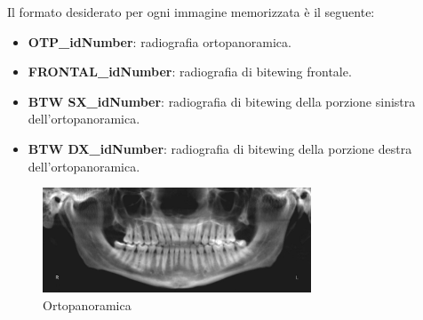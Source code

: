 \documentclass[12pt,a4paper,openright,twoside]{book}
\begin{document}
Il formato desiderato per ogni immagine memorizzata è il seguente:
\begin{itemize}
\item \textbf{OTP\_idNumber}: radiografia ortopanoramica.
\item \textbf{FRONTAL\_idNumber}: radiografia di bitewing frontale.
\item \textbf{BTW SX\_idNumber}: radiografia di bitewing della porzione sinistra dell'ortopanoramica.
\item \textbf{BTW DX\_idNumber}: radiografia di bitewing della porzione destra dell'ortopanoramica.
\end{itemize}

\begin{figure}[H]
    \centering
    \includegraphics[width=8cm]{figures/opt.pdf}
    \caption{Ortopanoramica}
    \label{fig:opt}
\end{figure}
\end{document}
